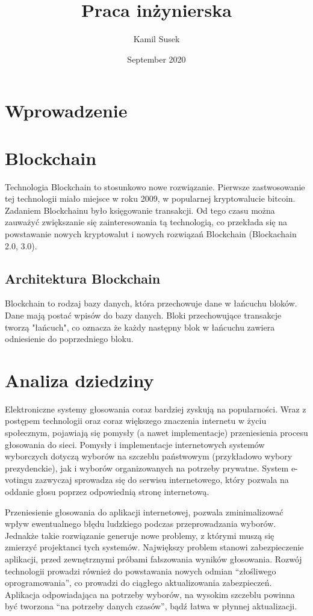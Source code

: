 \documentclass{report}
\begin{document}
\begin{titlepage}

\title{Praca inżynierska}
\author{Kamil Susek}
\date{September 2020}

\maketitle
\end{titlepage}
\chapter{Wprowadzenie}
\newpage
\chapter{Blockchain}
Technologia Blockchain to stosunkowo nowe rozwiązanie. Pierwsze zastwosowanie tej technologii miało miejsce w roku 2009, w popularnej kryptowalucie bitcoin. Zadaniem Blockchainu było księgowanie transakcji. Od tego czasu można zauważyć zwiększanie się zainteresowania tą technologią, co przekłada się na powstawanie nowych kryptowalut i nowych rozwiązań Blockchain (Blockachain 2.0, 3.0).
\section{Architektura Blockchain}
Blockchain to rodzaj bazy danych, która przechowuje dane w łańcuchu bloków. Dane mają postać wpisów do bazy danych. Bloki przechowujące transakcje tworzą "łańcuch", co oznacza że każdy następny blok w łańcuchu zawiera odniesienie do poprzedniego bloku. 
\newpage
\chapter{Analiza dziedziny}
Elektroniczne systemy głosowania coraz bardziej zyskują na popularności.
Wraz z postępem technologii oraz coraz większego znaczenia internetu w życiu 
społecznym, pojawiają się pomysły (a nawet implementacje) przeniesienia procesu głosowania do sieci. Pomysły i implementacje internetowych systemów wyborczych dotyczą wyborów na szczeblu państwowym (przykładowo wybory prezydenckie), jak i wyborów organizowanych na potrzeby prywatne. System e-votingu zazwyczaj sprowadza się do serwisu internetowego, który pozwala na oddanie głosu poprzez odpowiednią stronę internetową. 

Przeniesienie głosowania do aplikacji internetowej, pozwala zminimalizować wpływ ewentualnego błędu ludzkiego podczas przeprowadzania wyborów. Jednakże takie rozwiązanie generuje nowe problemy, z którymi muszą się zmierzyć projektanci tych systemów. Największy problem stanowi zabezpieczenie aplikacji, przed zewnętrznymi próbami fałszowania wyników głosowania. Rozwój technologii prowadzi również do powstawania nowych odmian “złośliwego oprogramowania”, co prowadzi do ciągłego aktualizowania zabezpieczeń. Aplikacja odpowiadająca na potrzeby wyborów, na wysokim szczeblu powinna być tworzona “na potrzeby danych czasów”, bądź łatwa w płynnej aktualizacji.
\end{document}
